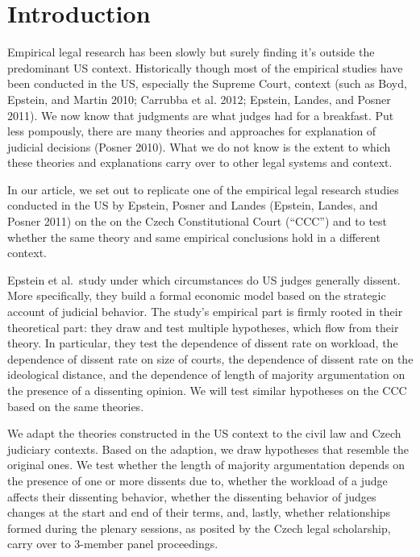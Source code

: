 \documentclass[
  11pt,
]{article}
\begin{document}
\vskip -8.5pt




\setlength{\parindent}{16pt}
\setlength{\parskip}{0pt}

\doublespacing
\vspace{30pt}

\hypertarget{introduction}{%
\section{Introduction}\label{introduction}}

Empirical legal research has been slowly but surely finding it's outside
the predominant US context. Historically though most of the empirical
studies have been conducted in the US, especially the Supreme Court,
context (such as Boyd, Epstein, and Martin 2010; Carrubba et al. 2012;
Epstein, Landes, and Posner 2011). We now know that judgments are what
judges had for a breakfast. Put less pompously, there are many theories
and approaches for explanation of judicial decisions (Posner 2010). What
we do not know is the extent to which these theories and explanations
carry over to other legal systems and context.

In our article, we set out to replicate one of the empirical legal
research studies conducted in the US by Epstein, Posner and Landes
(Epstein, Landes, and Posner 2011) on the on the Czech Constitutional
Court (``CCC'') and to test whether the same theory and same empirical
conclusions hold in a different context.

Epstein et al.~study under which circumstances do US judges generally
dissent. More specifically, they build a formal economic model based on
the strategic account of judicial behavior. The study's empirical part
is firmly rooted in their theoretical part: they draw and test multiple
hypotheses, which flow from their theory. In particular, they test the
dependence of dissent rate on workload, the dependence of dissent rate
on size of courts, the dependence of dissent rate on the ideological
distance, and the dependence of length of majority argumentation on the
presence of a dissenting opinion. We will test similar hypotheses on the
CCC based on the same theories.

We adapt the theories constructed in the US context to the civil law and
Czech judiciary contexts. Based on the adaption, we draw hypotheses that
resemble the original ones. We test whether the length of majority
argumentation depends on the presence of one or more dissents due to,
whether the workload of a judge affects their dissenting behavior,
whether the dissenting behavior of judges changes at the start and end
of their terms, and, lastly, whether relationships formed during the
plenary sessions, as posited by the Czech legal scholarship, carry over
to 3-member panel proceedings.
\end{document}
